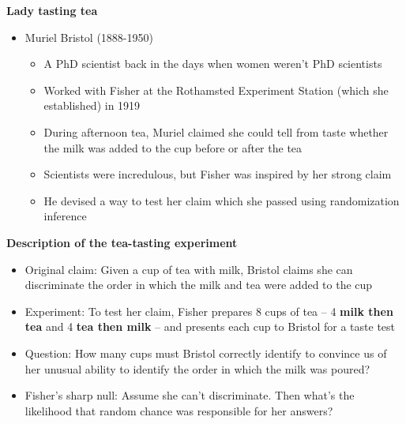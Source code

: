 \documentclass[notes=show]{beamer}
\begin{document}
\begin{frame}[plain]
\begin{center}
\textbf{Lady tasting tea}
\end{center}

\begin{itemize}
	\item Muriel Bristol (1888-1950)
		\begin{itemize}
		\item A PhD scientist back in the days when women weren't PhD scientists
		\item Worked with Fisher at the Rothamsted Experiment Station (which she established) in 1919 
		\item During afternoon tea, Muriel claimed she could tell from taste whether the milk was added to the cup before or after the tea
		\item Scientists were incredulous, but Fisher was inspired by her strong claim
		\item He devised a way to test her claim which she passed using randomization inference
		\end{itemize}
\end{itemize}

\end{frame}

\begin{frame}[plain]
	\begin{center}
	\textbf{Description of the tea-tasting experiment}
	\end{center}

	\begin{itemize}
	\item Original claim: Given a cup of tea with milk, Bristol claims she can discriminate the order in which the milk and tea were added to the cup
	\item Experiment: To test her claim, Fisher prepares 8 cups of tea -- 4 \textbf{milk then tea} and 4 \textbf{tea then milk} -- and presents each cup to Bristol for a taste test
	\item Question: How many cups must Bristol correctly identify to convince us of her unusual ability to identify the order in which the milk was poured?
	\item Fisher's sharp null: Assume she can't discriminate.  Then what's the likelihood that random chance was responsible for her answers?
	\end{itemize}
\end{frame}
\end{document}
